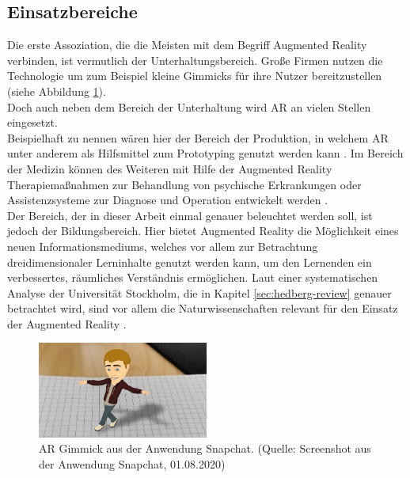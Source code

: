 \subsection{Einsatzbereiche}
Die erste Assoziation, die die Meisten mit dem Begriff Augmented Reality verbinden, ist vermutlich der Unterhaltungsbereich. Große Firmen nutzen die Technologie um zum Beispiel kleine Gimmicks für ihre Nutzer bereitzustellen (siehe Abbildung \ref{fig:snapchat-ar}).\\
Doch auch neben dem Bereich der Unterhaltung wird AR an vielen Stellen eingesetzt.\\
Beispielhaft zu nennen wären hier der Bereich der Produktion, in welchem AR unter anderem als Hilfsmittel zum Prototyping genutzt werden kann \citep[S. 44]{tab:augmented-reality}. Im Bereich der Medizin können des Weiteren mit Hilfe der Augmented Reality Therapiemaßnahmen zur Behandlung von psychische Erkrankungen oder Assistenzsysteme zur Diagnose und Operation entwickelt werden \citep[S. 52, 54]{tab:augmented-reality}.\\
Der Bereich, der in dieser Arbeit einmal genauer beleuchtet werden soll, ist jedoch der Bildungsbereich.
Hier bietet Augmented Reality die Möglichkeit eines neuen Informationsmediums, welches vor allem zur Betrachtung dreidimensionaler Lerninhalte genutzt werden kann, um den Lernenden ein verbessertes, räumliches Verständnis ermöglichen. 
Laut einer systematischen Analyse der Universität Stockholm, die in Kapitel \ref{sec:hedberg-review} genauer betrachtet wird, sind vor allem die Naturwissenschaften relevant für den Einsatz der Augmented Reality  \citep[S. 81]{hedberg:review-ar-learning}. 

\begin{figure}
\centering
\includegraphics[width=0.5\textwidth]{Abbildungen/snapchat-ar.jpg}
\caption[Augmented Reality: Beispiel Snapchat]{AR Gimmick aus der Anwendung Snapchat. (Quelle: Screenshot aus der Anwendung Snapchat, 01.08.2020)}
\label{fig:snapchat-ar}
\end{figure}

